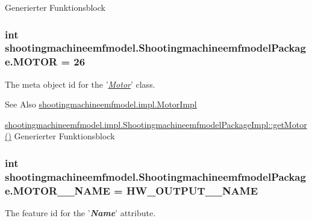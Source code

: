 Generierter Funktionsblock  \hypertarget{interfaceshootingmachineemfmodel_1_1_shootingmachineemfmodel_package_a9144b6eba68be5a47fdd021422d73dbd}{
\subsubsection[{M\-O\-T\-O\-R}]{\setlength{\rightskip}{0pt plus 5cm}int shootingmachineemfmodel.\-Shootingmachineemfmodel\-Package.\-M\-O\-T\-O\-R = 26}}\label{interfaceshootingmachineemfmodel_1_1_shootingmachineemfmodel_package_a9144b6eba68be5a47fdd021422d73dbd}
The meta object id for the '\hyperlink{classshootingmachineemfmodel_1_1impl_1_1_motor_impl}{{\itshape Motor}}' class.

\begin{DoxySeeAlso}{See Also}
\hyperlink{classshootingmachineemfmodel_1_1impl_1_1_motor_impl}{shootingmachineemfmodel.\-impl.\-Motor\-Impl} 

\hyperlink{classshootingmachineemfmodel_1_1impl_1_1_shootingmachineemfmodel_package_impl_a4821ab45885bc62267d5bb70879d0262}{shootingmachineemfmodel.\-impl.\-Shootingmachineemfmodel\-Package\-Impl\-::get\-Motor()} Generierter Funktionsblock 
\end{DoxySeeAlso}
\hypertarget{interfaceshootingmachineemfmodel_1_1_shootingmachineemfmodel_package_a0a00df33c791b334924d8650e4c3a8bb}{
\subsubsection[{M\-O\-T\-O\-R\-\_\-\-\_\-\-N\-A\-M\-E}]{\setlength{\rightskip}{0pt plus 5cm}int shootingmachineemfmodel.\-Shootingmachineemfmodel\-Package.\-M\-O\-T\-O\-R\-\_\-\-\_\-\-N\-A\-M\-E = {\bf H\-W\-\_\-\-O\-U\-T\-P\-U\-T\-\_\-\-\_\-\-N\-A\-M\-E}}}\label{interfaceshootingmachineemfmodel_1_1_shootingmachineemfmodel_package_a0a00df33c791b334924d8650e4c3a8bb}
The feature id for the '{\itshape {\bfseries Name}}' attribute.

